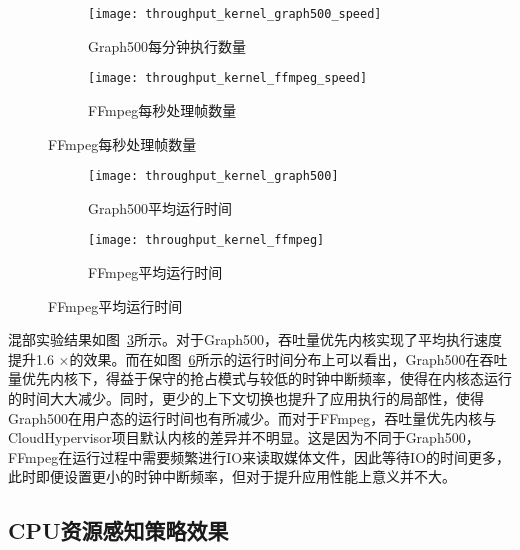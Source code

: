 \begin{figure}[H]
    \centering
    \begin{subfigure}[b]{0.35\textwidth}
        \texttt{[image: throughput\_kernel\_graph500\_speed]}
        \caption{\quad Graph500每分钟执行数量}
        \label{fig:throughput_kernel_graph500_speed}
    \end{subfigure}
    \begin{subfigure}[b]{0.35\textwidth}
        \texttt{[image: throughput\_kernel\_ffmpeg\_speed]}
        \caption{\quad FFmpeg每秒处理帧数量}
        \label{fig:throughput_kernel_ffmpeg_speed}
    \end{subfigure}
    \label{fig:perf_throughput}
\end{figure}

\begin{figure}[H]
    \centering
    \begin{subfigure}[b]{0.35\textwidth}
        \texttt{[image: throughput\_kernel\_graph500]}
        \caption{\quad Graph500平均运行时间}
        \label{fig:throughput_kernel_graph500}
    \end{subfigure}
    \begin{subfigure}[b]{0.35\textwidth}
        \texttt{[image: throughput\_kernel\_ffmpeg]}
        \caption{\quad FFmpeg平均运行时间}
        \label{fig:throughput_kernel_ffmpeg}
    \end{subfigure}
    \label{fig:perf_throughput_time}
\end{figure}

混部实验结果如图~\ref{fig:perf_throughput}所示。对于Graph500，吞吐量优先内核实现了平均执行速度提升1.6 $\times$的效果。而在如图~\ref{fig:perf_throughput_time}所示的运行时间分布上可以看出，Graph500在吞吐量优先内核下，得益于保守的抢占模式与较低的时钟中断频率，使得在内核态运行的时间大大减少。同时，更少的上下文切换也提升了应用执行的局部性，使得Graph500在用户态的运行时间也有所减少。而对于FFmpeg，吞吐量优先内核与CloudHypervisor项目默认内核的差异并不明显。这是因为不同于Graph500，FFmpeg在运行过程中需要频繁进行IO来读取媒体文件，因此等待IO的时间更多，此时即便设置更小的时钟中断频率，但对于提升应用性能上意义并不大。



\subsection{CPU资源感知策略效果}

